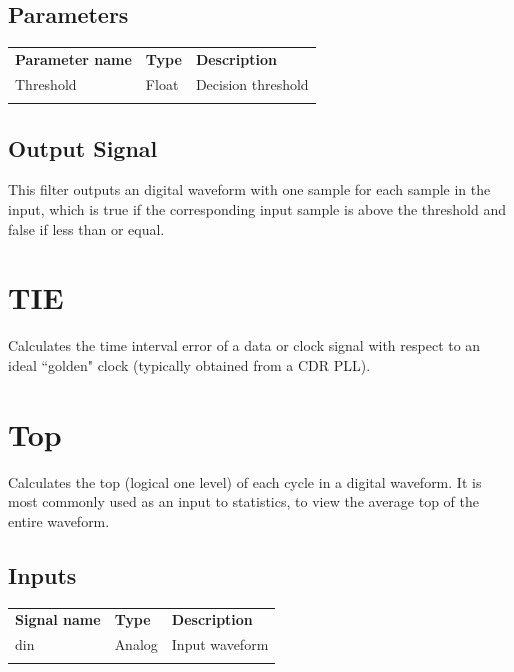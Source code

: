 \subsection{Parameters}

\begin{tabularx}{16cm}{llX}
\thickhline
\textbf{Parameter name} & \textbf{Type} & \textbf{Description} \\
\thickhline
Threshold & Float & Decision threshold \\
\thickhline
\end{tabularx}

\subsection{Output Signal}

This filter outputs an digital waveform with one sample for each sample in the input, which is true if the
corresponding input sample is above the threshold and false if less than or equal.

\pagebreak
\section{TIE}

Calculates the time interval error of a data or clock signal with respect to an ideal ``golden" clock (typically
obtained from a CDR PLL).

\pagebreak
\section{Top}

Calculates the top (logical one level) of each cycle in a digital waveform. It is most commonly used as an input to
statistics, to view the average top of the entire waveform.

\subsection{Inputs}

\begin{tabularx}{16cm}{llX}
\thickhline
\textbf{Signal name} & \textbf{Type} & \textbf{Description} \\
\thickhline
din & Analog & Input waveform \\
\thickhline
\end{tabularx}

